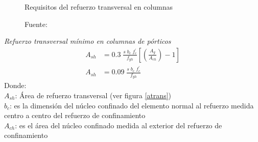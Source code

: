 \begin{figure}[hb!]
    \centering
      \caption{Requisitos del refuerzo transversal en columnas}
    \vspace{5mm}
   \caption*{Fuente: \cite{CAPUCP}} 
    \label{reqv}
\end{figure}
\noindent
\textit{Refuerzo transversal mínimo en columnas de pórticos}\\
\begin{align}
A_{sh} &=0.3\; \frac{s\; b_{c}\;f_{c}^{\prime}}{f_{yh}}\left[\left(\frac{A_{g}}{A_{ch}}\right)-1\right]\label{ascolmin} \\
A_{sh} &=0.09\; \frac{s\; b_{c}\; f_{c}^{\prime}}{f_{yh}}\label{ascolmin2}
\end{align}
\noindent Donde:\\
$A_{sh}$: Área de refuerzo transversal (ver figura \ref{atrans})\\
$b_{c}$: es la dimensión del núcleo confinado del elemento normal al refuerzo medida centro a centro del refuerzo de confinamiento\\
$A_{ch}$: es el área del núcleo confinado medida al exterior del refuerzo de confinamiento\\
